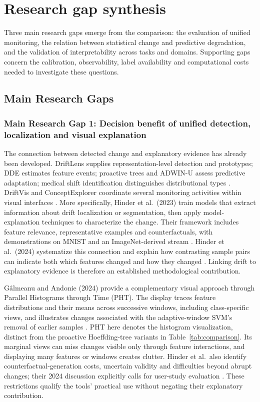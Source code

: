 \documentclass[10pt,a4paper]{article}
\begin{document}
\clearpage
\section{Research gap synthesis}
Three main research gaps emerge from the comparison: the evaluation of unified monitoring, the relation between statistical change and predictive degradation, and the validation of interpretability across tasks and domains. Supporting gaps concern the calibration, observability, label availability and computational costs needed to investigate these questions.

\subsection{Main Research Gaps}
\subsubsection*{Main Research Gap 1: Decision benefit of unified detection, localization and visual explanation}
The connection between detected change and explanatory evidence has already been developed. DriftLens supplies representation-level detection and prototypes; DDE estimates feature events; proactive trees and ADWIN-U assess predictive adaptation; medical shift identification distinguishes distributional types \cite{greco,szucs,guerrero,assis,roschewitz}. DriftVis and ConceptExplorer coordinate several monitoring activities within visual interfaces \cite{driftvis,conceptexplorer}. More specifically, Hinder et al.\ (2023) train models that extract information about drift localization or segmentation, then apply model-explanation techniques to characterize the change. Their framework includes feature relevance, representative examples and counterfactuals, with demonstrations on MNIST and an ImageNet-derived stream \cite[Secs.~3--4]{hinder2023}. Hinder et al.\ (2024) systematize this connection and explain how contrasting sample pairs can indicate both which features changed and how they changed \cite[Sec.~4.3.2]{hinder2024}. Linking drift to explanatory evidence is therefore an established methodological contribution.

G\^almeanu and Andonie (2024) provide a complementary visual approach through Parallel Histograms through Time (PHT). The display traces feature distributions and their means across successive windows, including class-specific views, and illustrates changes associated with the adaptive-window SVM's removal of earlier samples \cite[Secs.~3--4]{galmeanu}. PHT here denotes the histogram visualization, distinct from the proactive Hoeffding-tree variants in Table~\ref{tab:comparison}. Its marginal views can miss changes visible only through feature interactions, and displaying many features or windows creates clutter. Hinder et al.\ also identify counterfactual-generation costs, uncertain validity and difficulties beyond abrupt changes; their 2024 discussion explicitly calls for user-study evaluation \cite[Secs.~4.3.2--4.4]{hinder2024}. These restrictions qualify the tools' practical use without negating their explanatory contribution.
\end{document}
